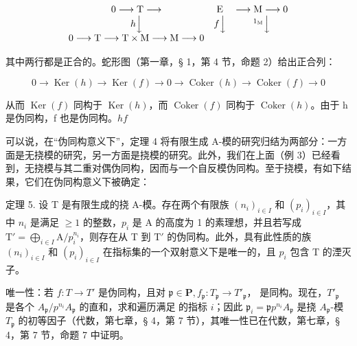 \[
\begin{array}{c c c} 0 \longrightarrow \mathrm{T} \longrightarrow & \mathrm{E} & \longrightarrow \mathrm{M} \longrightarrow 0 \\ h \Big \downarrow & f \Big \downarrow & ^ {1 _ {\mathrm{M}}} \Big \downarrow \\ 0 \longrightarrow \mathrm{T} \longrightarrow \mathrm{T} \times \mathrm{M} \longrightarrow \mathrm{M} \longrightarrow 0 \end{array}
\]

其中两行都是正合的。蛇形图（第一章，§ 1，第 4 节，命题 2）给出正合列：

\[
0 \rightarrow \operatorname{Ker} (h) \rightarrow \operatorname{Ker} (f) \rightarrow 0 \rightarrow \operatorname{Coker} (h) \rightarrow \operatorname{Coker} (f) \rightarrow 0
\]

从而 \(\operatorname{Ker}(f)\) 同构于 \(\operatorname{Ker}(h)\)，而 \(\operatorname{Coker}(f)\) 同构于 \(\operatorname{Coker}(h)\)。由于 h 是伪同构，f 也是伪同构。\(h\)\(f\)

可以说，在``伪同构意义下''，定理 4 将有限生成 A-模的研究归结为两部分：一方面是无挠模的研究，另一方面是挠模的研究。此外，我们在上面（例 3）已经看到，无挠模与其二重对偶伪同构，因而与一个自反模伪同构。至于挠模，有如下结果，它们在伪同构意义下被确定：

定理 5. 设 T 是有限生成的挠 A-模。存在两个有限族 \((n_i)_{i\in I}\) 和 \((p_i)_{i\in I}\)，其中 \(n_i\) 是满足 \(\geqslant 1\) 的整数，\(p_i\) 是 A 的高度为 1 的素理想，并且若写成 \(\mathrm{T}' = \bigoplus_{i\in I} \mathrm{A} / p_i^{n_i}\)，则存在从 T 到 \(\mathrm{T}'\) 的伪同构。此外，具有此性质的族 \((n_i)_{i\in I}\) 和 \((p_i)_{i\in I}\) 在指标集的一个双射意义下是唯一的，且 \(p_i\) 包含 T 的湮灭子。

唯一性：若 \(f\colon T\to T'\) 是伪同构，且对 \(\mathfrak{p}\in\mathbf{P},f_{\mathfrak{p}}\colon T_{\mathfrak{p}}\to T'_{\mathfrak{p}}\)， 是同构。现在，\(T'_{\mathfrak{p}}\) 是各个 \(A_{\mathfrak{p}}/p^{n_{i}}A_{\mathfrak{p}}\) 的直和，求和遍历满足  的指标 \(i\)；因此 \(\mathfrak{p}_{i}=\mathfrak{p}\)\(p^{n_{i}}A_{\mathfrak{p}}\) 是挠 \(A_{\mathfrak{p}}\)-模 \(T_{\mathfrak{p}}\) 的初等因子（代数，第七章，§ 4，第 7 节），其唯一性已在代数，第七章，§ 4，第 7 节，命题 7 中证明。

